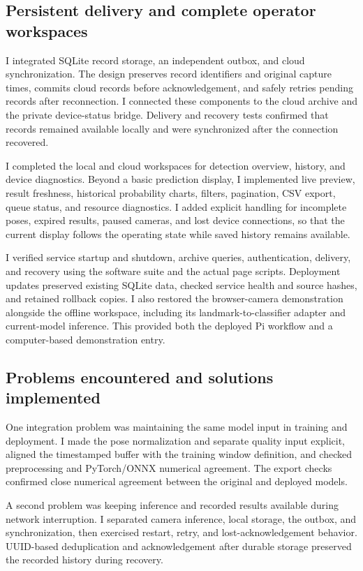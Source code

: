 \documentclass[conference,a4paper]{IEEEtran}
\begin{document}
\subsection{Persistent delivery and complete operator workspaces}

I integrated SQLite record storage, an independent outbox, and cloud synchronization. The design preserves record identifiers and original capture times, commits cloud records before acknowledgement, and safely retries pending records after reconnection. I connected these components to the cloud archive and the private device-status bridge. Delivery and recovery tests confirmed that records remained available locally and were synchronized after the connection recovered.

I completed the local and cloud workspaces for detection overview, history, and device diagnostics. Beyond a basic prediction display, I implemented live preview, result freshness, historical probability charts, filters, pagination, CSV export, queue status, and resource diagnostics. I added explicit handling for incomplete poses, expired results, paused cameras, and lost device connections, so that the current display follows the operating state while saved history remains available.

I verified service startup and shutdown, archive queries, authentication, delivery, and recovery using the software suite and the actual page scripts. Deployment updates preserved existing SQLite data, checked service health and source hashes, and retained rollback copies. I also restored the browser-camera demonstration alongside the offline workspace, including its landmark-to-classifier adapter and current-model inference. This provided both the deployed Pi workflow and a computer-based demonstration entry.

\subsection{Problems encountered and solutions implemented}

One integration problem was maintaining the same model input in training and deployment. I made the pose normalization and separate quality input explicit, aligned the timestamped buffer with the training window definition, and checked preprocessing and PyTorch/ONNX numerical agreement. The export checks confirmed close numerical agreement between the original and deployed models.

A second problem was keeping inference and recorded results available during network interruption. I separated camera inference, local storage, the outbox, and synchronization, then exercised restart, retry, and lost-acknowledgement behavior. UUID-based deduplication and acknowledgement after durable storage preserved the recorded history during recovery.
\end{document}
